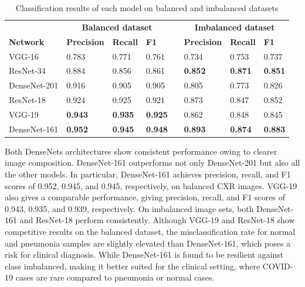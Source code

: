 \documentclass[conference]{IEEEtran}
\begin{document}
\begin{table}
    \centering
	\caption{Classification results of each model on balanced and imbalanced datasets} 
	\label{Table:all_models}
	\scriptsize{
	\begin{tabular}{p{2.9cm}p{1.6cm}p{1.4cm}p{1.0cm}p{0.3cm}p{1.5cm}p{1.4cm}p{1.0cm}}
	 & \multicolumn{3}{c}{\bfseries{Balanced dataset}} && \multicolumn{3}{c}{\bfseries{Imbalanced dataset}} \\
		\cmidrule{2-4}\cmidrule{6-8}   
        \textbf{Network}& \textbf{Precision} & \textbf{Recall}& \textbf{F1} && \textbf{Precision} & \textbf{Recall}& \textbf{F1}\\
		\hline
		VGG-16 & 0.783 & 0.771 & 0.761 && 0.734 & 0.753 & 0.737\\
		ResNet-34 & 0.884 & 0.856 & 0.861 && \textbf{0.852} & \textbf{0.871} & \textbf{0.851} \\
		DenseNet-201  & 0.916 & 0.905 & 0.905 && 0.805 & 0.773 & 0.826\\		
		ResNet-18 & 0.924 & 0.925 & 0.921 && 0.873 & 0.847 & 0.852\\
		VGG-19 & \textbf{0.943} & \textbf{0.935} & \textbf{0.925} && 0.862 & 0.848 & 0.845\\
		DenseNet-161  & \textbf{0.952} & \textbf{0.945} & \textbf{0.948} && \textbf{0.893} & \textbf{0.874} & \textbf{0.883}\\
		\hline
	\end{tabular}}
\end{table}

Both DenseNets architectures show consistent performance owing to clearer image composition. DenseNet-161 outperforms not only DenseNet-201 but also all the other models. In particular, DenseNet-161 achieves precision, recall, and F1 scores of 0.952, 0.945, and 0.945, respectively, on balanced CXR images. VGG-19 also gives a comparable performance, giving precision, recall, and F1 scores of 0.943, 0.935, and 0.939, respectively. 
On imbalanced image sets, both DenseNet-161 and ResNet-18 perform consistently. Although VGG-19 and ResNet-18 show competitive results on the balanced dataset, the misclassification rate for normal and pneumonia samples are slightly elevated than DenseNet-161, which poses a risk for clinical diagnosis. While DenseNet-161 is found to be resilient against class imbalanced, making it better suited for the clinical setting, where COVID-19 cases are rare compared to pneumonia or normal cases. %
\end{document}
